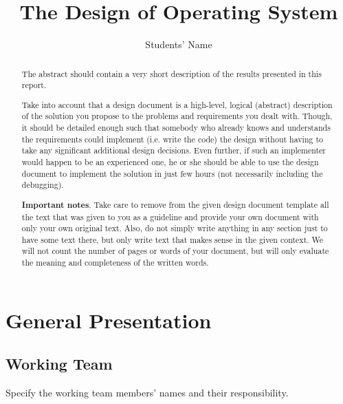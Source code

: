 \documentclass[a4paper,12pt]{report}
\title{The Design of \OSName{} Operating System}
\author{Students' Name}
\begin{document}

\maketitle

\begin{abstract}
The abstract should contain a very short description of the results presented in this report. 

Take into account that a design document is a high-level, logical (abstract) description of the solution you propose to the problems and requirements you dealt with. Though, it should be detailed enough such that somebody who already knows and understands the requirements could implement (i.e. write the code) the design without having to take any significant additional design decisions. Even further, if such an implementer would happen to be an experienced one, he or she should be able to use the design document to implement the solution in just few hours (not necessarily including the debugging). 

\textbf{Important notes}. Take care to remove from the given design document template all the text that was given to you as a guideline and provide your own document with only your own original text. Also, do not simply write anything in any section just to have some text there, but only write text that makes sense in the given context. We will not count the number of pages or words of your document, but will only evaluate the meaning and completeness of the written words. 
\end{abstract}


\chapter{General Presentation}

\section{Working Team}

Specify the working team members' names and their responsibility.
\end{document}
